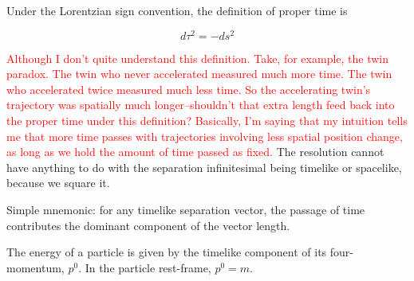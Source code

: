 \documentclass[11pt]{article}
\begin{document}
Under the Lorentzian sign convention, the definition of proper time is

\begin{equation}
	d\tau^2 = -ds^2
\end{equation}

\textcolor{red}{Although I don't quite understand this definition. Take, for
example, the twin paradox. The twin who never accelerated measured much more
time. The twin who accelerated twice measured much less time. So the
accelerating twin's trajectory was spatially much longer--shouldn't that extra
length feed back into the proper time under this definition? Basically, I'm
saying that my intuition tells me that more time passes with trajectories
involving less spatial position change, as long as we hold the amount of time
passed as fixed.} The resolution cannot have anything to do with the separation
infinitesimal being timelike or spacelike, because we square it.

Simple mnemonic: for any timelike separation vector, the passage of time
contributes the dominant component of the vector length.

The energy of a particle is given by the timelike component of its
four-momentum, $p^0$. In the particle rest-frame, $p^0 = m$.
\end{document}
